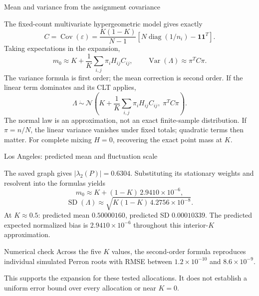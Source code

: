 \begin{frame}{Mean and variance from the assignment covariance}
\small

The fixed-count multivariate hypergeometric model gives exactly
\[
 C=\operatorname{Cov}(\varepsilon)
 =\frac{K(1-K)}{N-1}\left[N\operatorname{diag}(1/n_i)-\mathbf1\mathbf1^T\right].
\]
Taking expectations in the expansion,
\[
 \boxed{m_0\approx K+\frac1K\sum_{i,j}\pi_iH_{ij}C_{ij}},\qquad
 \boxed{\operatorname{Var}(\Lambda)\approx\pi^TC\pi.}
\]
The variance formula is first order; the mean correction is second order.
\medskip
If the linear term dominates and its CLT applies,
\[
 \Lambda\ \dot\sim\ \mathcal N\!\left(K+\frac1K\sum_{i,j}\pi_iH_{ij}C_{ij},\;\pi^TC\pi\right).
\]
\footnotesize The normal law is an approximation, not an exact finite-sample distribution. If $\pi=n/N$, the linear variance vanishes under fixed totals; quadratic terms then matter. For complete mixing $H=0$, recovering the exact point mass at $K$.

\end{frame}

\begin{frame}{Los Angeles: predicted mean and fluctuation scale}
\small

The saved graph gives $|\lambda_2(P)|=0.6304$. Substituting its stationary weights and resolvent into the formulas yields
\[
 \boxed{m_0\approx K+(1-K)\,2.9410\times10^{-6}},
\]
\[
 \boxed{\operatorname{SD}(\Lambda)\approx
 \sqrt{K(1-K)\,4.2756\times10^{-8}}.}
\]
At $K\approx0.5$: predicted mean $0.50000160$, predicted SD $0.00010339$.
\medskip
The predicted expected normalized bias is $2.9410\times10^{-6}$ throughout this interior-$K$ approximation.
\begin{block}{Numerical check}
Across the five $K$ values, the second-order formula reproduces individual simulated Perron roots with RMSE between $1.2\times10^{-10}$ and $8.6\times10^{-9}$.
\end{block}
\footnotesize This supports the expansion for these tested allocations. It does not establish a uniform error bound over every allocation or near $K=0$.

\end{frame}

